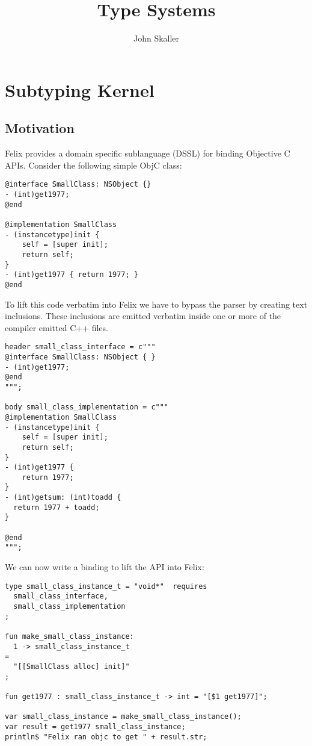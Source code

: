 \documentclass[oneside]{book}
\title{Type Systems}
\author{John Skaller}
\begin{document}
\maketitle
\tableofcontents
\part{Subtyping Kernel}
\chapter{Motivation}
Felix provides a domain specific sublanguage (DSSL) for binding Objective C APIs.
Consider the following simple ObjC class:
\begin{verbatim}
@interface SmallClass: NSObject {}
- (int)get1977;
@end

@implementation SmallClass
- (instancetype)init {
	self = [super init];
	return self;
}
- (int)get1977 { return 1977; }
@end
\end{verbatim}

To lift this code verbatim into Felix we have to bypass the parser
by creating text inclusions. These inclusions are emitted verbatim
inside one or more of the compiler emitted C++ files.

\begin{verbatim}
header small_class_interface = c"""
@interface SmallClass: NSObject { }
- (int)get1977;
@end
""";

body small_class_implementation = c"""
@implementation SmallClass
- (instancetype)init {
	self = [super init];
	return self;
}
- (int)get1977 {
	return 1977;
}
- (int)getsum: (int)toadd {
  return 1977 + toadd;
}

@end
""";
\end{verbatim}

We can now write a binding to lift the API into Felix:

\begin{verbatim}
type small_class_instance_t = "void*"  requires 
  small_class_interface, 
  small_class_implementation
;

fun make_small_class_instance:
  1 -> small_class_instance_t 
= 
  "[[SmallClass alloc] init]"
;

fun get1977 : small_class_instance_t -> int = "[$1 get1977]";

var small_class_instance = make_small_class_instance();
var result = get1977 small_class_instance;
println$ "Felix ran objc to get " + result.str;
\end{verbatim}
\end{document}
